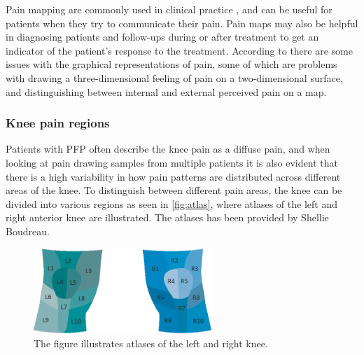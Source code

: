 Pain mapping are commonly used in clinical practice \citep{Schott2010}, and can be useful for patients when they try to communicate their pain. Pain maps may also be helpful in diagnosing patients and follow-ups during or after treatment to get an indicator of the patient’s response to the treatment.\citep{Boudreau2016}
According to \citeauthor{Schott2010} there are some issues with the graphical representations of pain, some of which are problems with drawing a three-dimensional feeling of pain on a two-dimensional surface, and distinguishing between internal and external perceived pain on a map.\citep{Schott2010}

\subsubsection{Knee pain regions}
Patients with PFP often describe the knee pain as a diffuse pain, and when looking at pain drawing samples from multiple patients it is also evident that there is a high variability in how pain patterns are distributed across different areas of the knee. 
To distinguish between different pain areas, the knee can be divided into various regions as seen in \autoref{fig:atlas}, where atlases of the left and right anterior knee are illustrated. The atlases has been provided by Shellie Boudreau. 

\begin{figure} [H]
\centering
\includegraphics[width=0.6\textwidth]{figures/atlas}
\caption{The figure illustrates atlases of the left and right knee.}
\label{fig:atlas}
\end{figure}

\newpage